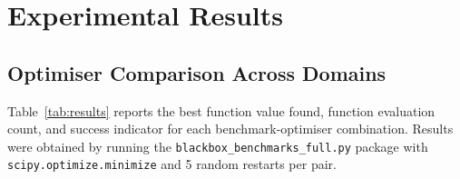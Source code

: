 \clearpage

\section{Experimental Results}

\subsection{Optimiser Comparison Across Domains}

Table~\ref{tab:results} reports the best function value found, function
evaluation count, and success indicator for each benchmark-optimiser
combination. Results were obtained by running the \texttt{blackbox\_benchmarks\_full.py}
package with \texttt{scipy.optimize.minimize} and 5 random restarts per pair.

